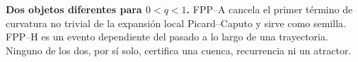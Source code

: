 \begin{center}
{%
}
\par\smallskip
\begin{minipage}{0.92\linewidth}
\small\textbf{Dos objetos diferentes para \(0<q<1\).}
FPP--A cancela el primer término de curvatura no trivial de la expansión local
Picard--Caputo y sirve como semilla. FPP--H es un evento dependiente del pasado
a lo largo de una trayectoria. Ninguno de los dos, por sí solo, certifica una
cuenca, recurrencia ni un atractor.
\end{minipage}
\end{center}
